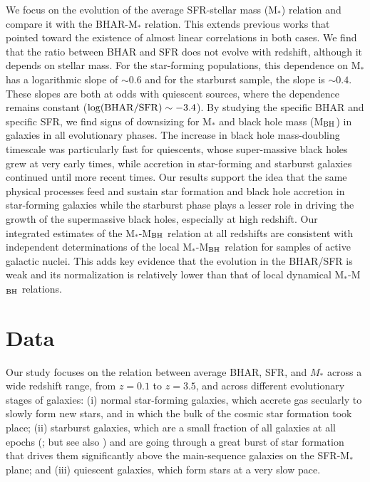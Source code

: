    We focus on the evolution of the average SFR-stellar mass (M$_*$) relation and compare it with the BHAR-M$_*$ relation. This extends previous works that pointed toward the existence of almost linear correlations in both cases. We find that the ratio between BHAR and SFR does not evolve with redshift, although it depends on stellar mass. For the star-forming populations, this dependence on M$_*$ has a logarithmic slope of $\sim0.6$ and for the starburst sample, the slope is $\sim0.4$. These slopes are both at odds with quiescent sources, where the dependence remains constant ($\log(\rm {BHAR}/{\rm SFR})\sim -3.4$).
   By studying the specific BHAR and specific SFR, we find signs of downsizing for M$_*$ and black hole mass (M$_{\rm BH}$) in galaxies in all evolutionary phases. The increase in black hole mass-doubling timescale was particularly fast for quiescents, whose super-massive black holes grew at very early times, while accretion in star-forming and starburst galaxies  continued until more recent times.
   Our results support the idea that the same physical processes feed and sustain star formation and black hole accretion in star-forming galaxies while the starburst phase plays a lesser role in driving the growth of the supermassive black holes, especially at high redshift. 
   Our integrated estimates of the M$_*$-M$_{\rm BH}$ relation at all redshifts are consistent with independent determinations of the local M$_*$-M$_{\rm BH}$ relation for samples of active galactic nuclei. This adds key evidence that the evolution in the BHAR/SFR is weak and its normalization is relatively lower than that of local dynamical M$_*$-M$_{\rm BH}$ relations.

\section{Data} \label{sec:data}
Our study focuses on the relation between average BHAR, SFR, and $M_*$ across a wide redshift range, from $z=0.1$ to $z=3.5$, and across different evolutionary stages of galaxies: (i) normal star-forming galaxies, which accrete gas secularly to slowly form new stars, and in which the bulk of the cosmic star formation took place; (ii) starburst galaxies, which are a small fraction of all galaxies at all epochs (\citealt[$\sim2\%$]{2011ApJ...739L..40R}; but see also \citealt{2017ApJ...849...45C}) 
and are going through a great burst of star formation that drives them significantly above the main-sequence galaxies on the SFR-M$_*$ plane;
and (iii) quiescent galaxies, which form stars at a very slow pace. 

